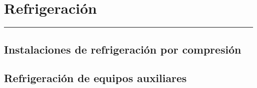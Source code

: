\chapter{Refrigeración}

\vspace{\fill}

\hrule

\vspace{.3cm}

{\large \lipsum[1]} 

\pagestyle{fancy}

\newpage


	\section{Instalaciones de refrigeración por compresión}
	\Biblio{}

	\section{Refrigeración de equipos auxiliares}
	\Biblio{}



\newpage
\pagestyle{empty}